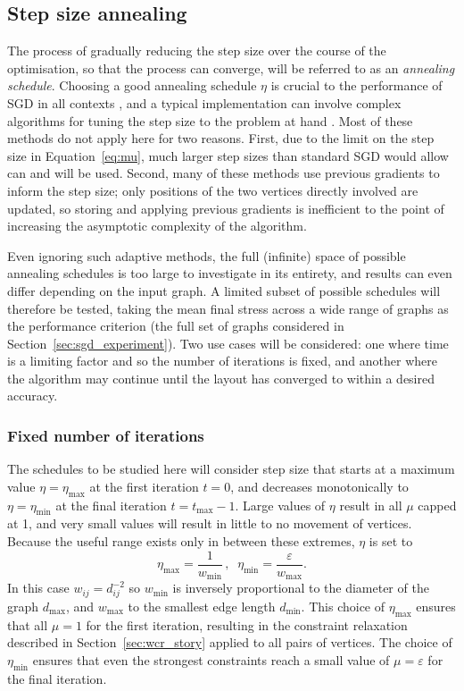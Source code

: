 \subsection{Step size annealing}
\label{sec:annealing}
The process of gradually reducing the step size over the course of the optimisation, so that the process can converge, will be referred to as an \emph{annealing schedule}.
Choosing a good annealing schedule $\eta$ is crucial to the performance of SGD in all contexts \cite{Darken1992}, and a typical implementation can involve complex algorithms for tuning the step size to the problem at hand \cite{Ruder2016}.
Most of these methods do not apply here for two reasons. First, due to the limit on the step size in Equation~\eqref{eq:mu}, much larger step sizes than standard SGD would allow can and will be used. Second, many of these methods use previous gradients to inform the step size; only positions of the two vertices directly involved are updated, so storing and applying previous gradients is inefficient to the point of increasing the asymptotic complexity of the algorithm.

Even ignoring such adaptive methods, the full (infinite) space of possible annealing schedules is too large to investigate in its entirety, and results can even differ depending on the input graph. A limited subset of possible schedules will therefore be tested, taking the mean final stress across a wide range of graphs as the performance criterion
(the full set of graphs considered in Section~\ref{sec:sgd_experiment}).
Two use cases will be considered: one where time is a limiting factor and so the number of iterations is fixed, and another where the algorithm may continue until the layout has converged to within a desired accuracy.

\subsubsection{Fixed number of iterations}
The schedules to be studied here will consider step size that starts at a maximum value $\eta=\eta_\mathrm{max}$ at the first iteration $t=0$, and decreases monotonically to $\eta=\eta_\mathrm{min}$ at the final iteration $t=t_\mathrm{max}-1$.
Large values of $\eta$ result in all $\mu$ capped at 1, and very small values will result in little to no movement of vertices. Because the useful range exists only in between these extremes, $\eta$ is set to
\begin{equation}
  \eta_{\max} = \frac{1}{w_{\min}} \,,\;\; \eta_{\min} = \frac{\varepsilon}{w_{\max}}.
  \label{eq:etamaxmin}
\end{equation}
In this case $w_{ij} = d_{ij}^{-2}$ so $w_{\min}$ is inversely proportional to the diameter of the graph $d_{\max}$, and $w_{\max}$ to the smallest edge length $d_{\min}$.
This choice of $\eta_{\max}$ ensures that all $\mu = 1$ for the first iteration, resulting in the constraint relaxation described in Section~\ref{sec:wcr_story} applied to all pairs of vertices. The choice of $\eta_{\min}$ ensures that even the strongest constraints reach a small value of $\mu = \varepsilon$ for the final iteration.

